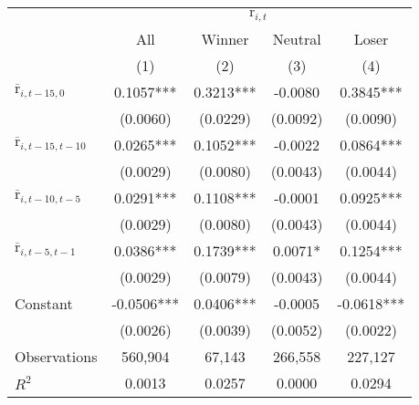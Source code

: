 \begin{tabular}{lcccc}
\toprule
 & \multicolumn{4}{c}{$\text{r}_{i,t}$} \\
\cmidrule{2-5}
 & All & Winner & Neutral & Loser\\
 & (1) & (2) & (3) & (4) \\
\midrule
$\overline{\text{r}}_{i,t-15,0}$ & 0.1057*** & 0.3213*** & -0.0080 & 0.3845*** \\
 & (0.0060) & (0.0229) & (0.0092) & (0.0090) \\
$\overline{\text{r}}_{i,t-15,t-10}$ & 0.0265*** & 0.1052*** & -0.0022 & 0.0864*** \\
 & (0.0029) & (0.0080) & (0.0043) & (0.0044) \\
$\overline{\text{r}}_{i,t-10,t-5}$ & 0.0291*** & 0.1108*** & -0.0001 & 0.0925*** \\
 & (0.0029) & (0.0080) & (0.0043) & (0.0044) \\
$\overline{\text{r}}_{i,t-5,t-1}$ & 0.0386*** & 0.1739*** & 0.0071* & 0.1254*** \\
 & (0.0029) & (0.0079) & (0.0043) & (0.0044) \\
Constant & -0.0506*** & 0.0406*** & -0.0005 & -0.0618*** \\
 & (0.0026) & (0.0039) & (0.0052) & (0.0022) \\
\midrule
Observations & 560,904 & 67,143 & 266,558 & 227,127 \\
$R^2$ & 0.0013 & 0.0257 & 0.0000 & 0.0294 \\
\bottomrule
\end{tabular}